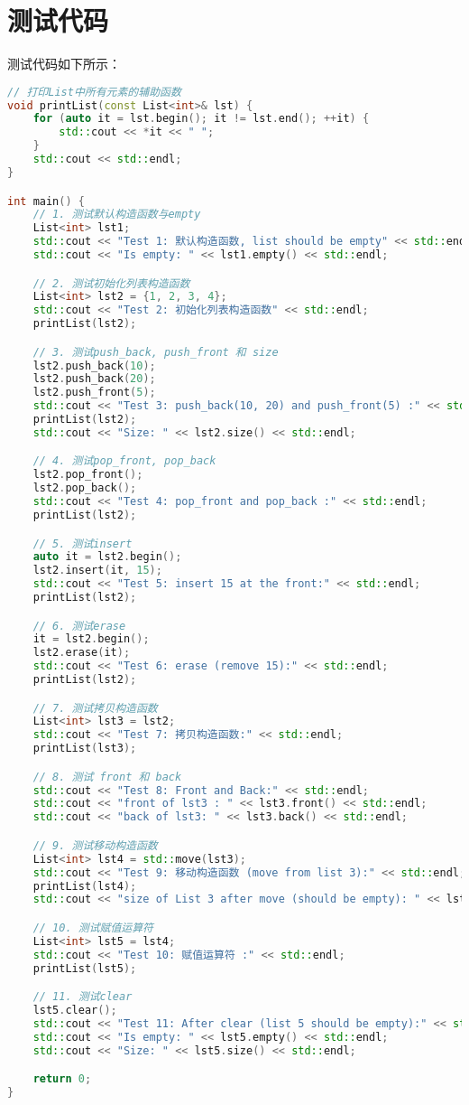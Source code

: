 \documentclass[UTF8]{ctexart}
\begin{document}
\section{测试代码}
测试代码如下所示：
\begin{lstlisting}[language=C++]
// 打印List中所有元素的辅助函数
void printList(const List<int>& lst) {
    for (auto it = lst.begin(); it != lst.end(); ++it) {
        std::cout << *it << " ";
    }
    std::cout << std::endl;
}

int main() {
    // 1. 测试默认构造函数与empty
    List<int> lst1;
    std::cout << "Test 1: 默认构造函数, list should be empty" << std::endl;
    std::cout << "Is empty: " << lst1.empty() << std::endl;

    // 2. 测试初始化列表构造函数
    List<int> lst2 = {1, 2, 3, 4};
    std::cout << "Test 2: 初始化列表构造函数" << std::endl;
    printList(lst2);

    // 3. 测试push_back, push_front 和 size
    lst2.push_back(10);
    lst2.push_back(20);
    lst2.push_front(5);
    std::cout << "Test 3: push_back(10, 20) and push_front(5) :" << std::endl;
    printList(lst2);
    std::cout << "Size: " << lst2.size() << std::endl;

    // 4. 测试pop_front, pop_back
    lst2.pop_front();
    lst2.pop_back();
    std::cout << "Test 4: pop_front and pop_back :" << std::endl;
    printList(lst2);

    // 5. 测试insert
    auto it = lst2.begin();
    lst2.insert(it, 15);
    std::cout << "Test 5: insert 15 at the front:" << std::endl;
    printList(lst2);

    // 6. 测试erase
    it = lst2.begin();
    lst2.erase(it);
    std::cout << "Test 6: erase (remove 15):" << std::endl;
    printList(lst2);

    // 7. 测试拷贝构造函数
    List<int> lst3 = lst2;
    std::cout << "Test 7: 拷贝构造函数:" << std::endl;
    printList(lst3);

    // 8. 测试 front 和 back
    std::cout << "Test 8: Front and Back:" << std::endl;
    std::cout << "front of lst3 : " << lst3.front() << std::endl;
    std::cout << "back of lst3: " << lst3.back() << std::endl;

    // 9. 测试移动构造函数
    List<int> lst4 = std::move(lst3);
    std::cout << "Test 9: 移动构造函数 (move from list 3):" << std::endl;
    printList(lst4);
    std::cout << "size of List 3 after move (should be empty): " << lst3.size() << std::endl;

    // 10. 测试赋值运算符
    List<int> lst5 = lst4;
    std::cout << "Test 10: 赋值运算符 :" << std::endl;
    printList(lst5);

    // 11. 测试clear
    lst5.clear();
    std::cout << "Test 11: After clear (list 5 should be empty):" << std::endl;
    std::cout << "Is empty: " << lst5.empty() << std::endl;
    std::cout << "Size: " << lst5.size() << std::endl;

    return 0;
}
\end{lstlisting}
\end{document}
